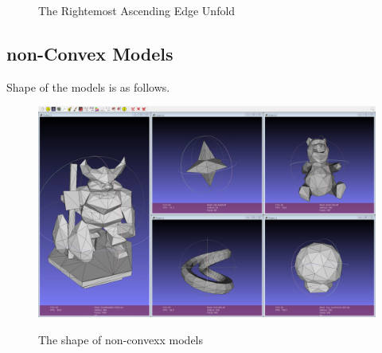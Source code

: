 \documentclass[11pt, letterpaper]{article}
\begin{document}
\begin{figure}[h]
\centering
{}
\hspace{5mm}
\hspace{5mm}
\hspace{5mm}
\hspace{5mm}
\caption{The Rightemost Ascending Edge Unfold}
\end{figure}

\clearpage
\subsection{non-Convex Models}
Shape of the models is as follows.
\begin{figure}[th]
\centering
{\includegraphics[height=0.4\textwidth]{FIGS/nonconvex.jpg}}
\caption{The shape of non-convexx models}
\label{fig:nonconvex}
\end{figure}
\end{document}
